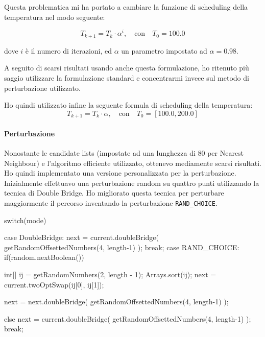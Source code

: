 \documentclass{article}
\begin{document}
Questa problematica mi ha portato a cambiare la funzione di scheduling della
temperatura nel modo seguente:

\begin{equation}
    T_{k+1} = T_k \cdot \alpha^{i}, \quad \text{con} \quad T_0 = 100.0
\end{equation}

dove $i$ è il numero di iterazioni, ed $\alpha$ un parametro impostato ad $\alpha = 0.98$.
\pagebreak

A seguito di scarsi risultati usando anche questa formulazione, ho ritenuto più
saggio utilizzare la formulazione standard e concentrarmi invece sul metodo
di perturbazione utilizzato.

Ho quindi utilizzato infine la seguente formula di scheduling della temperatura:
\begin{equation}
    T_{k+1} = T_k \cdot \alpha, \quad \text{con} \quad T_0 = [ 100.0, 200.0 ]
\end{equation}

\paragraph{Perturbazione} Nonostante le candidate lists (impostate ad una lunghezza
di 80 per Nearest Neighbour) e l'algoritmo efficiente utilizzato, ottenevo mediamente
scarsi risultati. Ho quindi implementato una versione personalizzata
per la perturbazione. Inizialmente effettuavo una perturbazione random su quattro
punti utilizzando la tecnica di Double Bridge. Ho migliorato questa tecnica per
perturbare maggiormente il percorso inventando la perturbazione \texttt{RAND\_CHOICE}.

\begin{code}
    switch(mode){
            case DoubleBridge:
            next = current.doubleBridge(
            getRandomOffsettedNumbers(4, length-1)
            );
            break;
            case RAND_CHOICE:
            if(random.nextBoolean()) {
                    int[] ij = getRandomNumbers(2, length - 1);
                    Arrays.sort(ij);
                    next = current.twoOptSwap(ij[0], ij[1]);

                    next = next.doubleBridge(
                    getRandomOffsettedNumbers(4, length-1)
                    );

                } else {
                    next = current.doubleBridge(
                    getRandomOffsettedNumbers(4, length-1)
                    );
                }
            break;
        }
\end{code}
\end{document}
